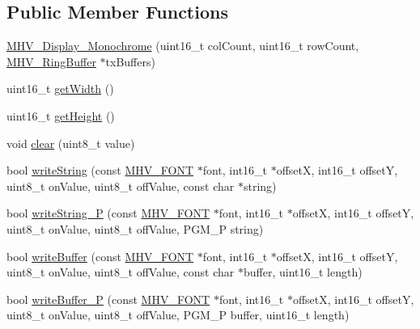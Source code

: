 \subsection*{\-Public \-Member \-Functions}
\begin{DoxyCompactItemize}
\item 
\hyperlink{class_m_h_v___display___monochrome_a28ba8d0420841b820935e2102f977602}{\-M\-H\-V\-\_\-\-Display\-\_\-\-Monochrome} (uint16\-\_\-t col\-Count, uint16\-\_\-t row\-Count, \hyperlink{class_m_h_v___ring_buffer}{\-M\-H\-V\-\_\-\-Ring\-Buffer} $\ast$tx\-Buffers)
\item 
uint16\-\_\-t \hyperlink{class_m_h_v___display___monochrome_a1ef9b1ddbc9e57007903076005335211}{get\-Width} ()
\item 
uint16\-\_\-t \hyperlink{class_m_h_v___display___monochrome_a988a98e01d54b12d3dcecc2d7878a985}{get\-Height} ()
\item 
void \hyperlink{class_m_h_v___display___monochrome_a25b062aefde440ad5c47dbca98b5b478}{clear} (uint8\-\_\-t value)
\item 
bool \hyperlink{class_m_h_v___display___monochrome_aaf243ab4abd9bc1c3a298a10dc178d99}{write\-String} (const \hyperlink{_m_h_v___font_8h_ab7088ba808ac223275dfd526d198356f}{\-M\-H\-V\-\_\-\-F\-O\-N\-T} $\ast$font, int16\-\_\-t $\ast$offset\-X, int16\-\_\-t offset\-Y, uint8\-\_\-t on\-Value, uint8\-\_\-t off\-Value, const char $\ast$string)
\item 
bool \hyperlink{class_m_h_v___display___monochrome_a3942e2c4facd80affaeef8c7b8e6dcfb}{write\-String\-\_\-\-P} (const \hyperlink{_m_h_v___font_8h_ab7088ba808ac223275dfd526d198356f}{\-M\-H\-V\-\_\-\-F\-O\-N\-T} $\ast$font, int16\-\_\-t $\ast$offset\-X, int16\-\_\-t offset\-Y, uint8\-\_\-t on\-Value, uint8\-\_\-t off\-Value, \-P\-G\-M\-\_\-\-P string)
\item 
bool \hyperlink{class_m_h_v___display___monochrome_abe4588ca31be3759738e38922fe8d3ad}{write\-Buffer} (const \hyperlink{_m_h_v___font_8h_ab7088ba808ac223275dfd526d198356f}{\-M\-H\-V\-\_\-\-F\-O\-N\-T} $\ast$font, int16\-\_\-t $\ast$offset\-X, int16\-\_\-t offset\-Y, uint8\-\_\-t on\-Value, uint8\-\_\-t off\-Value, const char $\ast$buffer, uint16\-\_\-t length)
\item 
bool \hyperlink{class_m_h_v___display___monochrome_a8e71ea1bf003d91679892f20389e851b}{write\-Buffer\-\_\-\-P} (const \hyperlink{_m_h_v___font_8h_ab7088ba808ac223275dfd526d198356f}{\-M\-H\-V\-\_\-\-F\-O\-N\-T} $\ast$font, int16\-\_\-t $\ast$offset\-X, int16\-\_\-t offset\-Y, uint8\-\_\-t on\-Value, uint8\-\_\-t off\-Value, \-P\-G\-M\-\_\-\-P buffer, uint16\-\_\-t length)

\end{DoxyCompactItemize}
